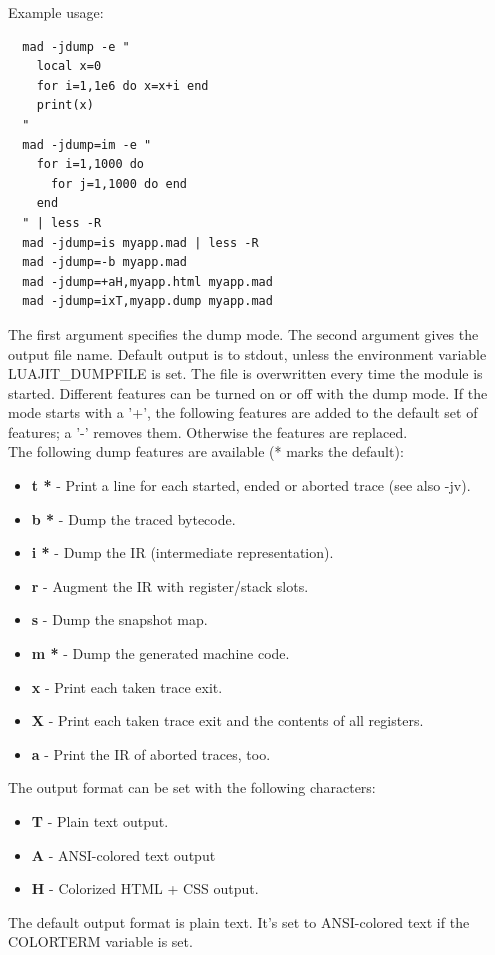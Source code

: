 Example usage:
\begin{lstlisting}
  mad -jdump -e "
    local x=0
    for i=1,1e6 do x=x+i end
    print(x)
  "
  mad -jdump=im -e "
    for i=1,1000 do
      for j=1,1000 do end
    end
  " | less -R
  mad -jdump=is myapp.mad | less -R
  mad -jdump=-b myapp.mad
  mad -jdump=+aH,myapp.html myapp.mad
  mad -jdump=ixT,myapp.dump myapp.mad
\end{lstlisting}
The first argument specifies the dump mode. The second argument gives
the output file name. Default output is to stdout, unless the environment
variable LUAJIT\_DUMPFILE is set. The file is overwritten every time the
module is started. Different features can be turned on or off with the dump mode.
If the mode starts with a '+', the following features are added to the default
set of features; a '-' removes them. Otherwise the features are replaced.\\
The following dump features are available (* marks the default):

\begin{itemize}
  \item \textbf{t *} - Print a line for each started, ended or aborted trace (see also -jv).
  \item \textbf{b *} - Dump the traced bytecode.
  \item \textbf{i *} - Dump the IR (intermediate representation).
  \item \textbf{r} - Augment the IR with register/stack slots.
  \item \textbf{s} - Dump the snapshot map.
  \item \textbf{m *} - Dump the generated machine code.
  \item \textbf{x} - Print each taken trace exit.
  \item \textbf{X} - Print each taken trace exit and the contents of all registers.
  \item \textbf{a} - Print the IR of aborted traces, too.
\end{itemize}
The output format can be set with the following characters:
\begin{itemize}
   \item \textbf{T} - Plain text output.
   \item \textbf{A} - ANSI-colored text output
   \item \textbf{H} - Colorized HTML + CSS output.
\end{itemize}
The default output format is plain text. It's set to ANSI-colored text
if the COLORTERM variable is set.

